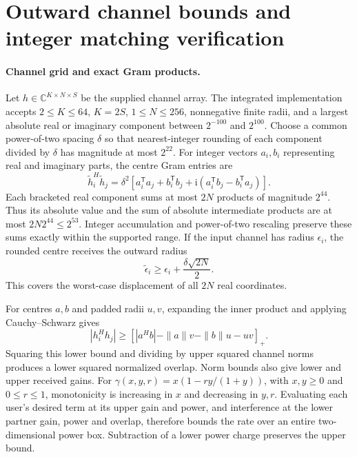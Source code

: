 \documentclass[10pt,letterpaper]{article}
\begin{document}
\FloatBarrier
\section{Outward channel bounds and integer matching verification}
\label{supp:note3}

\paragraph{Channel grid and exact Gram products.}
Let \(h\in\mathbb C^{K\times N\times S}\) be the supplied channel array. The integrated implementation accepts \(2\leq K\leq64\), \(K=2S\), \(1\leq N\leq256\), nonnegative finite radii, and a largest absolute real or imaginary component between \(2^{-100}\) and \(2^{100}\). Choose a common power-of-two spacing \(\delta\) so that nearest-integer rounding of each component divided by \(\delta\) has magnitude at most \(2^{22}\). For integer vectors \(a_i,b_i\) representing real and imaginary parts, the centre Gram entries are
\begin{equation}
 \widetilde h_i^H\widetilde h_j
 =\delta^2\left[
    a_i^\mathsf T a_j+b_i^\mathsf T b_j
    +\mathrm i(a_i^\mathsf T b_j-b_i^\mathsf T a_j)\right].
\end{equation}
Each bracketed real component sums at most \(2N\) products of magnitude \(2^{44}\). Thus its absolute value and the sum of absolute intermediate products are at most
\(2N2^{44}\leq2^{53}\). Integer accumulation and power-of-two rescaling preserve these sums exactly within the supported range. If the input channel has radius \(\epsilon_i\), the rounded centre receives the outward radius
\begin{equation}
 \widetilde\epsilon_i\geq\epsilon_i+\frac{\delta\sqrt{2N}}{2}.
\end{equation}
This covers the worst-case displacement of all \(2N\) real coordinates.

For centres \(a,b\) and padded radii \(u,v\), expanding the inner product and applying Cauchy--Schwarz gives
\begin{equation}
 |h_i^Hh_j|\geq
 \left[|a^Hb|-\|a\|v-\|b\|u-uv\right]_+ .
\end{equation}
Squaring this lower bound and dividing by upper squared channel norms produces a lower squared normalized overlap. Norm bounds also give lower and upper received gains. For
\(\gamma(x,y,r)=x(1-r y/(1+y))\), with \(x,y\geq0\) and \(0\leq r\leq1\), monotonicity is increasing in \(x\) and decreasing in \(y,r\). Evaluating each user's desired term at its upper gain and power, and interference at the lower partner gain, power and overlap, therefore bounds the rate over an entire two-dimensional power box. Subtraction of a lower power charge preserves the upper bound.
\end{document}
